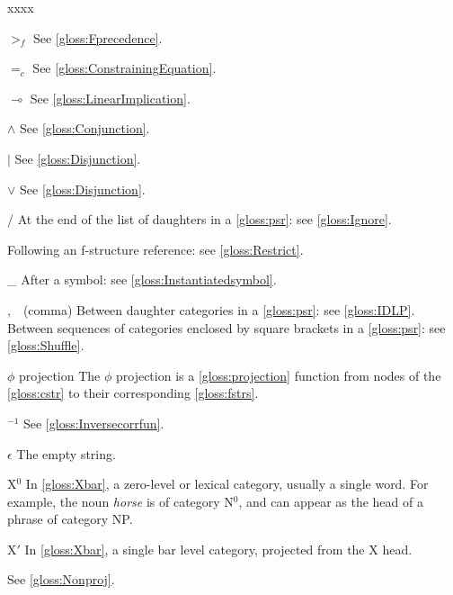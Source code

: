 \documentclass[output=paper,colorlinks,citecolor=brown]{langscibook}
\begin{document}
\begin{labeling}{xxxx}
\item[{$>_f$}] See \ref{gloss:Fprecedence}.

\item[$=_c$] See \ref{gloss:ConstrainingEquation}.

\item[$\multimap$] See \ref{gloss:LinearImplication}.

\item[$\wedge$] See \ref{gloss:Conjunction}.
 
\item[$\mid$] See \ref{gloss:Disjunction}.

\item[$\vee$] See \ref{gloss:Disjunction}.
 
\item[/] At the end of the list of daughters in a \ref{gloss:psr}: see \ref{gloss:Ignore}.

\item[\restrict{}] Following an f-structure reference: see \ref{gloss:Restrict}.

\item[\_] After a symbol: see \ref{gloss:Instantiatedsymbol}.

\item[,~~(comma)] Between daughter categories in a \ref{gloss:psr}: see \ref{gloss:IDLP}.  Between sequences of categories enclosed by square brackets in a \ref{gloss:psr}: see \ref{gloss:Shuffle}.

\item[$\phi$ projection\namedlabel{gloss:phi}{$\phi$ projection}] The $\phi$ projection is a \ref{gloss:projection} function from nodes of the \ref{gloss:cstr} to their corresponding \ref{gloss:fstrs}.

\item[$^{-1}$] See \ref{gloss:Inversecorrfun}.

\item[$\epsilon$] The empty string.

\item[X$^0$\namedlabel{gloss:xzero}{X$^0$}] In \ref{gloss:Xbar}, a zero-level or lexical category, usually a single word.  For example, the noun \emph{horse} is of category N$^0$, and can appear as the head of a phrase of category NP.

\item[X$'$] In \ref{gloss:Xbar}, a single bar level category, projected from the X head.

\item[\NONPROJ{X}] See \ref{gloss:Nonproj}.


\end{labeling}
\end{document}
